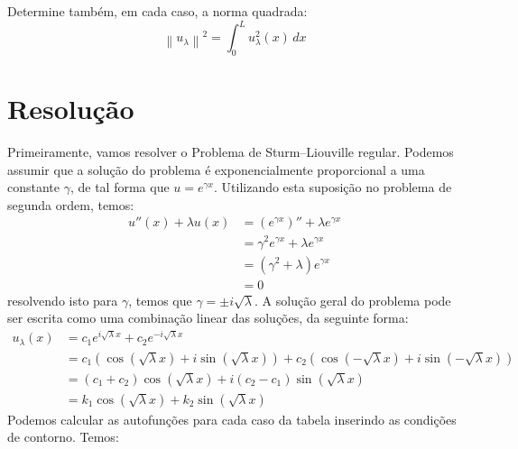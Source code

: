 \documentclass[10pt,a4paper]{article}
\newcommand{\prt}[1]{\left(#1\right)}
\newcommand{\norm}[1]{\left\lVert#1\right\rVert}
\begin{document}
Determine também, em cada caso, a norma quadrada:
\[\norm{u_\lambda}^2 = \int_0^L u_\lambda^2(x)\,dx\]

\newpage
\section{Resolução}
Primeiramente, vamos resolver o Problema de Sturm--Liouville regular. Podemos assumir que a solução do problema é exponencialmente proporcional a uma constante $\gamma$, de tal forma que $u = e^{\gamma x}$. Utilizando esta suposição no problema de segunda ordem, temos:
\begin{align*}
	u''(x)+\lambda u(x) &= \prt{e^{\gamma x}}'' + \lambda e^{\gamma x}\\
	&= \gamma^2 e^{\gamma x} + \lambda e^{\gamma x}\\
	&= \prt{\gamma^2+\lambda} e^{\gamma x}\\
	&= 0
\end{align*}
resolvendo isto para $\gamma$, temos que $\gamma = \pm i\sqrt{\lambda}$. A solução geral do problema pode ser escrita como uma combinação linear das soluções, da seguinte forma:
\begin{align*}
	u_\lambda(x) &= c_1e^{i\sqrt{\lambda}x} + c_2e^{-i\sqrt{\lambda}x}\\
	&= c_1\prt{\cos{\prt{\sqrt{\lambda}x}} + i\sin{\prt{\sqrt{\lambda}x}}} + c_2\prt{\cos{\prt{-\sqrt{\lambda}x}} + i\sin{\prt{-\sqrt{\lambda}x}}}\\
	&= (c_1+c_2)\cos{\prt{\sqrt{\lambda}x}} + i(c_2-c_1)\sin{\prt{\sqrt{\lambda}x}}\\
	&= k_1\cos{\prt{\sqrt{\lambda}x}} + k_2\sin{\prt{\sqrt{\lambda}x}}
\end{align*}
Podemos calcular as autofunções para cada caso da tabela inserindo as condições de contorno. Temos:
\end{document}
